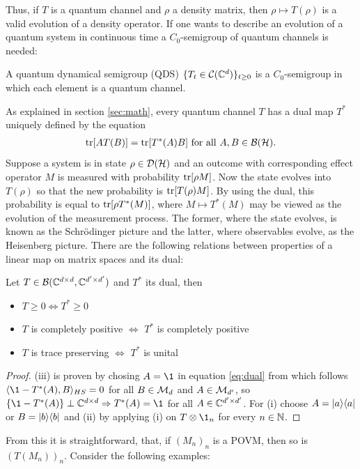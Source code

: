 Thus, if $T$ is a quantum channel and $\rho$ a density matrix, then $\rho \mapsto T(\rho)$ is a valid evolution of a density operator. If one wants to describe an evolution of a quantum system in continuous time a $C_0$-semigroup of quantum channels is needed:
\begin{definition}
    A quantum dynamical semigroup (QDS) $\{T_t \in \mathcal C(\mathbb{C}^d)\}_{t\geq 0}$ is a $C_0$-semigroup in which each element is a quantum channel.{}
\end{definition}

As explained in section \ref{sec:math}, every quantum channel $T$ has a dual map $T^*$ uniquely defined by the equation
\begin{align}\label{eq:dual}
\mathrm{tr}[AT(B)] = \mathrm{tr}[T^*(A)B]\text{ for all }A,B \in \mathcal B(\mathcal{H}).
\end{align}
Suppose a system is in state $\rho \in \mathcal D(\mathcal{H})$ and an outcome with corresponding effect operator $M$ is measured with probability $\mathrm{tr}[\rho M]$. Now the state evolves into $T(\rho)$ so that the new probability is $\mathrm{tr}[T(\rho)M]$. By using the dual, this probability is equal to $\mathrm{tr}[\rho T^*(M)]$, where $M \mapsto T^*(M)$ may be viewed as the evolution of the measurement process. The former, where the state evolves, is known as the Schrödinger picture and the latter, where observables evolve, as the Heisenberg picture. There are the following relations between properties of a linear map on matrix spaces and its dual:
\begin{prop}
    Let $T \in \mathcal B(\mathbb{C}^{d\times d},\mathbb{C}^{d' \times d'})$ and $T^*$ its dual, then
    \begin{itemize}
        \item[(i)]$T\geq0\Leftrightarrow T^* \geq 0$
        \item[(ii)]$T$ is completely positive $\Leftrightarrow$ $T^*$ is completely positive
        \item[(iii)]$T$ is trace preserving $\Leftrightarrow$ $T^*$ is unital{}
    \end{itemize}
\end{prop}
\begin{proof}
    (iii) is proven by chosing $A=\1$ in equation \eqref{eq:dual} from which follows $\langle \1-T^*(A), B\rangle_{HS}=0$ for all $B\in \mathcal M_d$ and $A\in \mathcal M_{d'}$, so $\{\1-T^*(A)\}\perp \C^{d \times d}\Rightarrow T^*(A)=\1$ for all $A \in \mathbb{C}^{d'\times d'}$. For (i) choose $A=\lvert a\rangle\langle a\rvert$ or $B=\lvert b\rangle\langle b\rvert$ and (ii) by applying (i) on $T \otimes \1_n$ for every $n\in\mathbb{N}$.
\end{proof}
From this it is straightforward, that, if $(M_n)_n$ is a POVM, then so is $(T(M_n))_n$. Consider the following examples:


